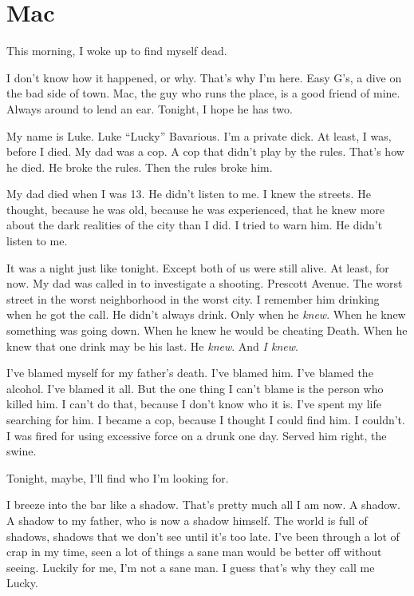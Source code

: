 \chapter{Mac}



This morning, I woke up to find myself dead.



I don't know how it happened, or why. That's why I'm here. Easy
G's, a dive on the bad side of town. Mac, the guy who runs the
place, is a good friend of mine. Always around to lend an ear.
Tonight, I hope he has two.



My name is Luke. Luke ``Lucky'' Bavarious. I'm a private dick. At
least, I was, before I died. My dad was a cop. A cop that didn't
play by the rules. That's how he died. He broke the rules. Then the
rules broke him.



My dad died when I was 13. He didn't listen to me. I knew the
streets. He thought, because he was old, because he was
experienced, that he knew more about the dark realities of the city
than I did. I tried to warn him. He didn't listen to me.



It was a night just like tonight. Except both of us were still
alive. At least, for now. My dad was called in to investigate a
shooting. Prescott Avenue. The worst street in the worst
neighborhood in the worst city. I remember him drinking when he got
the call. He didn't always drink. Only when he {\em knew}. When he
knew something was going down. When he knew he would be cheating
Death. When he knew that one drink may be his last. He {\em knew}.
And {\em I knew}.



I've blamed myself for my father's death. I've blamed him. I've
blamed the alcohol. I've blamed it all. But the one thing I can't
blame is the person who killed him. I can't do that, because I
don't know who it is. I've spent my life searching for him. I
became a cop, because I thought I could find him. I couldn't. I was
fired for using excessive force on a drunk one day. Served him
right, the swine.



Tonight, maybe, I'll find who I'm looking for.



I breeze into the bar like a shadow. That's pretty much all I am
now. A shadow. A shadow to my father, who is now a shadow himself.
The world is full of shadows, shadows that we don't see until it's
too late. I've been through a lot of crap in my time, seen a lot of
things a sane man would be better off without seeing. Luckily for
me, I'm not a sane man. I guess that's why they call me
Lucky.




